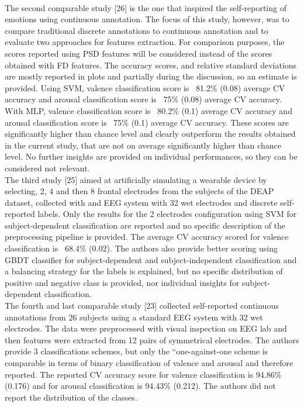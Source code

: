 \\
The second comparable study [26] is the one that inspired the self-reporting of emotions using continuous annotation. The focus of this study, however, was to compare traditional discrete annotations to continuous annotation and to evaluate two approaches for features extraction. For comparison purposes, the scores reported using PSD features will be considered instead of the scores obtained with FD features. The accuracy scores, and relative standard deviations are mostly reported in plots and partially during the discussion, so an estimate is provided. Using SVM, valence classification score is ~81.2\% (0.08) average CV accuracy and arousal classification score is ~75\% (0.08) average CV accuracy. With MLP, valence classification score is ~80.2\% (0.1) average CV accuracy and arousal classification score is ~75\% (0.1) average CV accuracy. These scores are significantly higher than chance level and clearly outperform the results obtained in the current study, that are not on average significantly higher than chance level. No further insights are provided on individual performances, so they can be considered not relevant. 
\\
The third study [25] aimed at artificially simulating a wearable device by selecting, 2, 4 and then 8 frontal electrodes from the subjects of the DEAP dataset, collected with and EEG system with 32 wet electrodes and discrete self-reported labels. Only the results for the 2 electrodes configuration using SVM for subject-dependent classification are reported and no specific description of the preprocessing pipeline is provided. The average CV accuracy scored for valence classification is ~68.4\% (0.02). The authors also provide better scoring using GBDT classifier for subject-dependent and subject-independent classification and a balancing strategy for the labels is explained, but no specific distribution of positive and negative class is provided, nor individual insights for subject-dependent classification.
\\
The fourth and last comparable study [23] collected self-reported continuous annotations from 26 subjects using a standard EEG system with 32 wet electrodes. The data were preprocessed with visual inspection on EEG lab and then features were extracted from 12 pairs of symmetrical electrodes. The authors provide 3 classifications schemes, but only the “one-against-one scheme is comparable in terms of binary classification of valence and arousal and therefore reported. The reported CV accuracy score for valence classification is 94.86\% (0.176) and for arousal classification is 94.43\% (0.212). The authors did not report the distribution of the classes.
